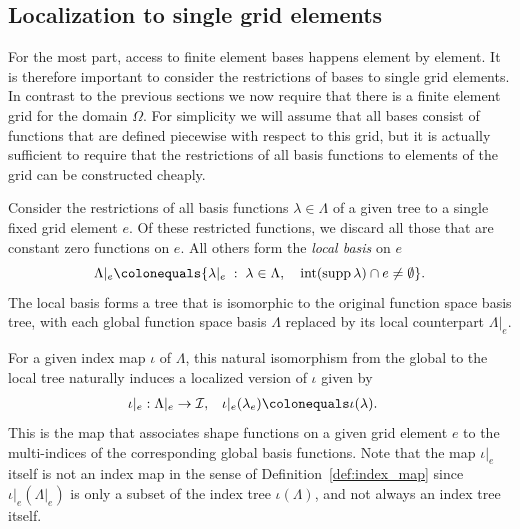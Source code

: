 \documentclass[a4paper,10pt,headings=normal,bibliography=totoc]{scrartcl}
\begin{document}
\subsection{Localization to single grid elements}
\label{sec:localization}

For the most part, access to finite element bases happens element by element.  It is therefore important
to consider the restrictions of bases to single grid elements.  In contrast to the previous sections
we now require that there is a finite element grid for the domain $\Omega$. For simplicity we will
assume that all bases consist of functions that are defined piecewise with respect to this grid,
but it is actually sufficient to require that the restrictions of all basis functions to elements
of the grid can be constructed cheaply.

Consider the restrictions of all basis functions $\lambda \in \Lambda$ of a given tree to a single fixed grid element $e$.
Of these restricted functions, we discard all those that are constant zero functions on $e$.
All others form the \emph{local basis} on $e$
\begin{equation*}
 \Lambda|_e
 \colonequals
 \{ \lambda|_e \; : \; \lambda \in \Lambda,
         \quad \operatorname{int}(\operatorname{supp} \lambda) \cap e \neq \emptyset \}.
\end{equation*}
The local basis forms a tree that is isomorphic to the original function space basis tree,
with each global function space basis $\Lambda$ replaced by its local counterpart $\Lambda|_e$.

For a given index map $\iota$ of $\Lambda$,
this natural isomorphism from the global to the local tree
naturally induces a localized version of $\iota$ given by
\begin{align*}
  \iota|_e : \Lambda|_e &\to \mathcal{I}, &
  \iota|_e(\lambda_e) &\colonequals \iota(\lambda).
\end{align*}
This is the map that associates shape functions on a given grid element $e$ to
the multi-indices of the corresponding global basis functions.
Note that the map $\iota|_e$ itself is not an index map in the sense of Definition~\ref{def:index_map}
since $\iota|_e(\Lambda|_e)$ is only a subset of the index tree $\iota(\Lambda)$,
and not always an index tree itself.
\end{document}
